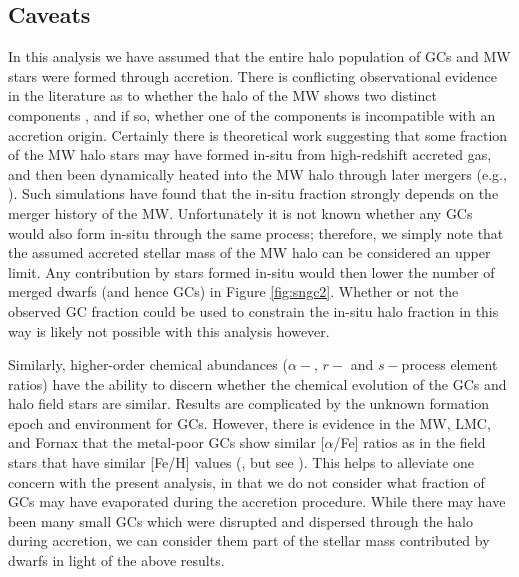 \documentclass[useAMS,usenatbib]{mn2e}
\begin{document}
\subsection{Caveats}
In this analysis we have assumed that the entire halo population of GCs and
MW stars were formed through accretion.  There is conflicting observational
evidence in the literature as to whether the halo of the MW shows two distinct
components \citep{Beers12,Schonrich11}, and if so, whether one of the components
is incompatible with an accretion origin.  Certainly there is
theoretical work suggesting that some fraction of the MW halo stars may have formed
in-situ from high-redshift accreted gas, and then been dynamically heated into the
MW halo through later mergers (e.g., \citealt{Zolotov09}).  Such simulations
have found that the in-situ fraction strongly depends on the merger history of
the MW.  Unfortunately it is not known whether any GCs would also form in-situ
through the same process; therefore, we simply note that the assumed accreted
stellar mass of the MW halo can be considered an upper limit.  Any contribution
by stars formed in-situ would then lower the number of merged dwarfs (and hence GCs)
in Figure \ref{fig:sngc2}.  Whether or not the observed GC fraction could be
used to constrain the in-situ halo fraction in this way is likely not possible
with this analysis however. 

Similarly, higher-order chemical abundances ($\alpha-$, $r-$ and $s-$process
element ratios) have the ability to discern whether the chemical evolution of
the GCs and halo field stars are similar.  Results are complicated by the
unknown formation epoch and environment for GCs.   However, there is evidence
in the MW, LMC, and Fornax that the metal-poor GCs show similar [$\alpha$/Fe]
ratios as in the field stars that have similar [Fe/H] values
(\citep{Pritzl05,Hill97,Letarte06,Mucciarelli11}, but see \citealt{Mateluna12}).
This helps to alleviate one concern with the present analysis, in that we do
not consider what fraction of GCs may have evaporated during the accretion
procedure.  While there may have been many small GCs which were disrupted and
dispersed through the halo during accretion, we can consider them part of the
stellar mass contributed by dwarfs in light of the above results.
\end{document}
